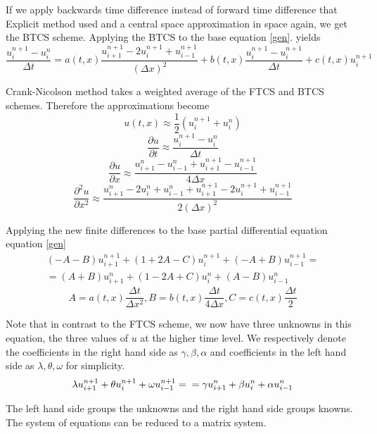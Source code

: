 \documentclass[12pt, oneside]{book}
\theoremstyle{plain}
\theoremstyle{definition}
\begin{document}
 If we apply backwards time difference instead of forward time difference that Explicit method used and a central space approximation in space again, we get the BTCS scheme. Applying the BTCS to the base equation \ref{gen}. yields
    \begin{equation}
\frac{u^{n+1}_i - u^n_i}{\Delta t}  = a(t, x)  \frac{u^{n+1}_{i+1}- 2u^{n+1}_i + u^{n+1}_{i-1}}{(\Delta x)^2}  + b(t, x)  \frac{u^{n+1}_i - u^{n+1}_i}{\Delta t}  + c(t, x)  u^{n+1}_i
\end{equation}

Crank-Nicolson method takes a weighted average of the FTCS and BTCS schemes. Therefore the approximations become
$$ u(t,x) \approx \frac{1}{2} ( u^{n+1}_i +  u^n_i) $$
$$ \frac{\partial u}{\partial t} \approx \frac{u^{n+1}_i - u^n_i}{\Delta t} $$
$$ \frac{\partial u}{\partial x} \approx \frac{u^n_{i+1} - u^n_{i-1} + u^{n+1}_{i+1} - u^{n+1}_{i-1}}{4\Delta x} $$
$$ \frac{\partial^2 u}{\partial x^2} \approx \frac{u^n_{i+1}- 2u^n_i + u^n_{i-1} + u^{n+1}_{i+1}- 2u^{n+1}_i + u^{n+1}_{i-1}}{2(\Delta x)^2} $$

Applying the new finite differences to the base partial differential equation equation \ref{gen}
\begin{multline}
 (-A -B) u^{n+1}_{i+1} + (1 + 2A - C) u^{n+1}_i + (-A + B) u^{n+1}_{i-1} =  \\
=  (A+B) u^{n}_{i+1} + (1 - 2A + C) u^{n}_i + (A - B) u^{n}_{i-1}
\end{multline}
$$ A = a(t,x) \frac{\Delta t}{\Delta x^2},  B = b(t,x) \frac{\Delta t}{4\Delta x}, C = c(t,x) \frac{\Delta t}{2}$$ 

Note that in contrast to the FTCS scheme, we now have three unknowns in this equation, the three values of $u$ at the higher time level.  We respectively denote the coefficients in the right hand side as $\gamma, \beta, \alpha$ and coefficients in the left hand side as $\lambda, \theta, \omega$ for simplicity.
\begin{equation}
\lambda u^{n+1}_{i+1} + \theta u^{n+1}_i + \omega u^{n+1}_{i-1} =  \\
=  \gamma u^{n}_{i+1} + \beta u^{n}_i + \alpha u^{n}_{i-1}
\end{equation}

The left hand side groups the unknowns and the right hand side groups knowns. The system of equations can be  reduced to a matrix system. 
\end{document}
